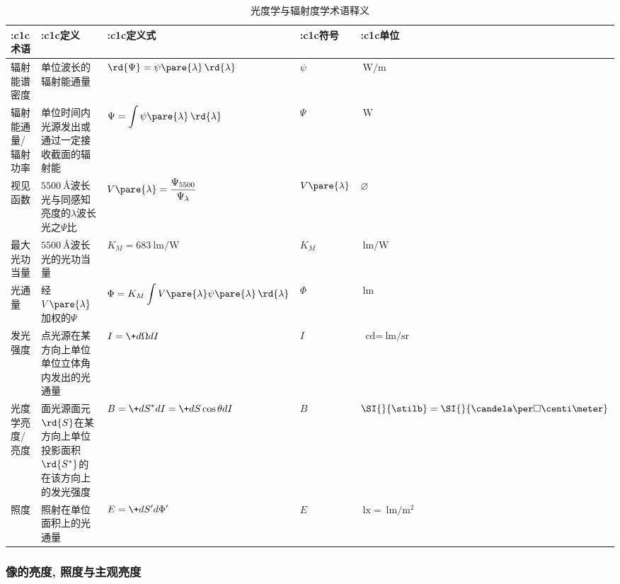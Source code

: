 \documentclass{ctexart}
\begin{document}
\begin{table}[ht]
    \centering
    \begin{tabular}{>{\centering\arraybackslash}m{1.5cm}m{3cm}>{\centering\arraybackslash}m{3cm}>{\centering\arraybackslash}m{1cm}>{\centering\arraybackslash}m{1.2cm}}
        \toprule
        \+:c{1}{c}{术语} & \+:c{1}{c}{定义} & \+:c{1}{c}{定义式} & \+:c{1}{c}{符号} & \+:c{1}{c}{单位} \\
        \midrule
        辐射能谱密度 & 单位波长的辐射能通量 & $\displaystyle \rd{\Psi} = \psi\pare{\lambda}\,\rd{\lambda}$ & $\psi$ & $\SI{}{\watt\per\meter}$ \\
        \midrule
        辐射能通量/辐射功率 & 单位时间内光源发出或通过一定接收截面的辐射能 & $\displaystyle \Psi = \int \psi\pare{\lambda}\,\rd{\lambda}$ & $\Psi$ & $\SI{}{\watt}$ \\
        \midrule
        视见函数 & $\SI{5500}{\angstrom}$波长光与同感知亮度的$\lambda$波长光之$\Psi$比 & $\displaystyle V\pare{\lambda} = \frac{\Psi_{5500}}{\Psi_\lambda}$ & $V\pare{\lambda}$ & $\varnothing$ \\
        \midrule
        最大光功当量 & $\SI{5500}{\angstrom}$波长光的光功当量 & $K_M = \SI{683}{\lumen\per\watt}$ & $K_M$ & $\SI{}{\lumen\per\watt}$ \\
        \midrule
        光通量 & 经$V\pare{\lambda}$加权的$\Psi$ & $\displaystyle \Phi = K_M \int V\pare{\lambda}\psi\pare{\lambda}\,\rd{\lambda}$ & $\Phi$ & $\SI{}{\lumen}$ \\
        \midrule
        发光强度 & 点光源在某方向上单位单位立体角内发出的光通量 & $\displaystyle I = \+d\Omega dI$ & $I$ & $\SI{}{\candela}=\allowbreak\SI{}{\lumen\per\steradian}$ \\
        \midrule
        光度学亮度/亮度 & 面光源面元$\rd{S}$在某方向上单位投影面积$\rd{S^*}$的在该方向上的发光强度 & $\displaystyle B = \+d{S^*}dI \allowbreak= \+d{S\cos\theta}d{I}$ & $B$ & $\SI{}{\stilb}=\allowbreak\SI{}{\candela\per\square\centi\meter}$ \\
        \midrule
        照度 & 照射在单位面积上的光通量 & $\displaystyle E = \+d{S'}d{\Phi'}$ & $E$ & $\SI{}{\lux} = \allowbreak\SI{}{\lumen\per\square\meter}$ \\
        \bottomrule
    \end{tabular}
    \caption{光度学与辐射度学术语释义}
    \label{table:光度学与辐射度学术语释义}
\end{table}

\subsubsection{像的亮度, 照度与主观亮度} %
\label{ssub:像的亮度_照度与主观亮度}
\end{document}
